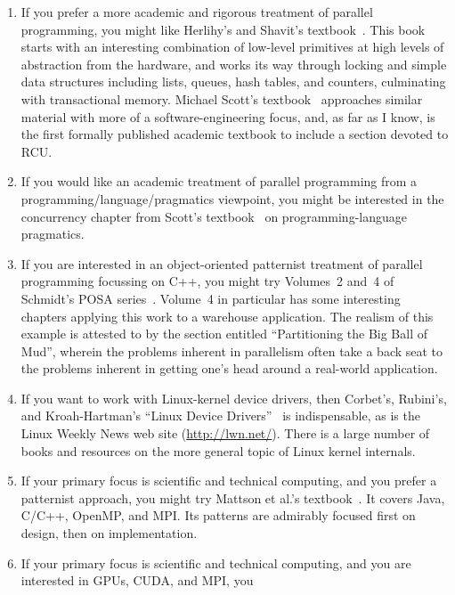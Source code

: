 \begin{enumerate}
\item	If you prefer a more academic and rigorous treatment of
	parallel programming,
	you might like Herlihy's and Shavit's
	textbook~\cite{HerlihyShavit2008Textbook}.
	This book starts with an interesting combination
	of low-level primitives at high levels of abstraction
	from the hardware, and works its way through locking
	and simple data structures including lists, queues,
	hash tables, and counters, culminating with transactional
	memory.
	Michael Scott's textbook~\cite{MichaelScott2013Textbook}
	approaches similar material with more of a
	software-engineering focus, and, as far as I know, is
	the first formally published academic textbook to include a
	section devoted to RCU.
\item	If you would like an academic treatment of parallel
	programming from a programming\-/language\-/pragmatics viewpoint,
	you might be interested in the concurrency chapter from Scott's
	textbook~\cite{MichaelScott2006Textbook}
	on programming-language pragmatics.
\item	If you are interested in an object-oriented patternist
	treatment of parallel programming focussing on C++,
	you might try Volumes~2 and~4 of Schmidt's POSA
	series~\cite{SchmidtStalRohnertBuschmann2000v2Textbook,
	BuschmannHenneySchmidt2007v4Textbook}.
	Volume~4 in particular has some interesting chapters
	applying this work to a warehouse application.
	The realism of this example is attested to by
	the section entitled ``Partitioning the Big Ball of Mud'',
	wherein the problems inherent in parallelism often
	take a back seat to the problems inherent in getting
	one's head around a real-world application.
\item	If you want to work with Linux-kernel device drivers,
	then Corbet's, Rubini's, and Kroah-Hartman's
	``Linux Device Drivers''~\cite{CorbetRubiniKroahHartman}
	is indispensable, as is the Linux Weekly News web site
	(\url{http://lwn.net/}).
	There is a large number of books and resources on
	the more general topic of Linux kernel internals.
\item	If your primary focus is scientific and technical computing,
	and you prefer a patternist approach,
	you might try Mattson et al.'s
	textbook~\cite{Mattson2005Textbook}.
	It covers Java, C/C++, OpenMP, and MPI.
	Its patterns are admirably focused first on design,
	then on implementation.
\item	If your primary focus is scientific and technical computing,
	and you are interested in GPUs, CUDA, and MPI, you

\end{enumerate}
